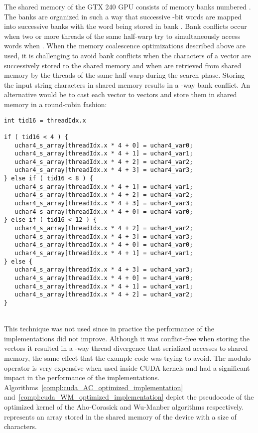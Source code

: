 \documentclass{ws-ijait}
\begin{document}
The shared memory of the GTX 240 GPU consists of  memory banks numbered . The banks are organized in such a way that successive -bit words are mapped into successive banks with the  word being stored in bank . Bank conflicts occur when two or more threads of the same half-warp try to simultaneously access words  when . When the memory coalescence optimizations described above are used, it is challenging to avoid bank conflicts when the  characters of a  vector are successively stored to the shared memory and when are retrieved from shared memory by the threads of the same half-warp during the search phase. Storing the input string characters in shared memory results in a -way bank conflict. An alternative would be to cast each  vector to   vectors and store them in shared memory in a round-robin fashion:

\noindent\begin{minipage}{\textwidth}
\begin{lstlisting}
int tid16 = threadIdx.x 

if ( tid16 < 4 ) {
   uchar4_s_array[threadIdx.x * 4 + 0] = uchar4_var0;
   uchar4_s_array[threadIdx.x * 4 + 1] = uchar4_var1;
   uchar4_s_array[threadIdx.x * 4 + 2] = uchar4_var2;
   uchar4_s_array[threadIdx.x * 4 + 3] = uchar4_var3;
} else if ( tid16 < 8 ) {
   uchar4_s_array[threadIdx.x * 4 + 1] = uchar4_var1;
   uchar4_s_array[threadIdx.x * 4 + 2] = uchar4_var2;
   uchar4_s_array[threadIdx.x * 4 + 3] = uchar4_var3;
   uchar4_s_array[threadIdx.x * 4 + 0] = uchar4_var0;
} else if ( tid16 < 12 ) {
   uchar4_s_array[threadIdx.x * 4 + 2] = uchar4_var2;
   uchar4_s_array[threadIdx.x * 4 + 3] = uchar4_var3;
   uchar4_s_array[threadIdx.x * 4 + 0] = uchar4_var0;
   uchar4_s_array[threadIdx.x * 4 + 1] = uchar4_var1;
} else {
   uchar4_s_array[threadIdx.x * 4 + 3] = uchar4_var3;
   uchar4_s_array[threadIdx.x * 4 + 0] = uchar4_var0;
   uchar4_s_array[threadIdx.x * 4 + 1] = uchar4_var1;
   uchar4_s_array[threadIdx.x * 4 + 2] = uchar4_var2;
}		
\end{lstlisting}
\end{minipage}\\

This technique was not used since in practice the performance of the implementations did not improve. Although it was conflict-free when storing the vectors it resulted in a -way thread divergence that serialized accesses to shared memory, the same effect that the example code was trying to avoid. The modulo operator is very expensive when used inside CUDA kernels and had a significant impact in the performance of the implementations. Algorithms~\ref{compl:cuda_AC_optimized_implementation} and~\ref{compl:cuda_WM_optimized_implementation} depict the pseudocode of the optimized kernel of the Aho-Corasick and Wu-Manber algorithms respectively.  represents an array stored in the shared memory of the device with a size of  characters.
\end{document}
